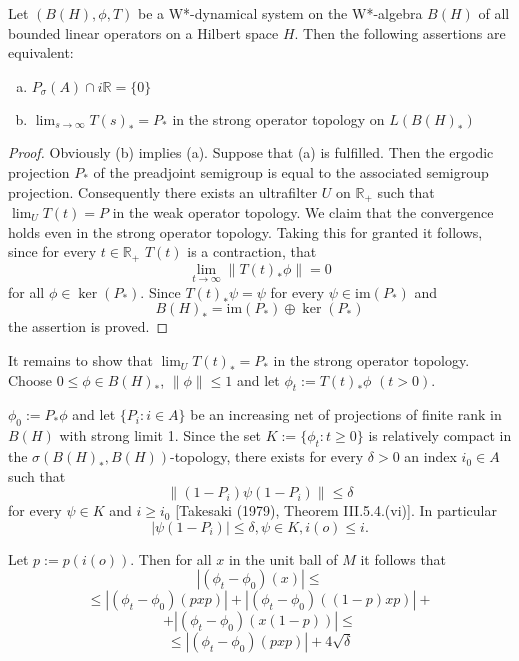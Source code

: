 \begin{proposition}\label{prop:d4-3-7}
Let \((B(H),\phi,T)\) be a W*-dynamical system on the W*-algebra \(B(H)\) of all bounded linear operators on a Hilbert space \(H\).
Then the following assertions are equivalent:
\begin{enumerate}[(a)]
\item
\(P_{\sigma}(A) \cap i\mathbb{R} = \{0\}\)

\item
\(\lim_{s \to \infty} T(s)_{*} = P_{*}\) in the strong operator topology on \(L(B(H)_{*})\)
\end{enumerate}
\end{proposition}

\begin{proof}
Obviously (b) implies (a).
Suppose that (a) is fulfilled.
Then the ergodic projection \(P_{*}\) of the preadjoint semigroup is equal to the associated semigroup projection.
Consequently there exists an ultrafilter \(U\) on \(\mathbb{R}_{+}\) such that \(\lim_{U} T(t) = P\) in the weak operator topology.
We claim that the convergence holds even in the strong operator topology.
Taking this for granted it follows, since for every \(t \in \mathbb{R}_{+}\) \(T(t)\) is a contraction, that
\[
\lim_{t \to \infty} \|T(t)_{*}\phi\| = 0
\]
for all \(\phi \in \ker(P_{*})\).
Since \(T(t)_{*}\psi = \psi\) for every \(\psi \in \text{im}(P_{*})\) and
\[
B(H)_{*} = \text{im}(P_{*}) \oplus \ker(P_{*})
\]
the assertion is proved.
\end{proof}


It remains to show that \(\lim_{U} T(t)_{*} = P_{*}\) in the strong operator topology.
Choose \(0 \leq \phi \in B(H)_{*}\), \(\|\phi\| \leq 1\) and let \(\phi_{t} := T(t)_{*}\phi\) \((t>0)\).

\newpage

\(\phi_{0} := P_{*}\phi\) and let \(\{P_{i}: i \in A\}\) be an increasing net of projections of finite rank in \(B(H)\) with strong limit 1.
Since the set \(K := \{\phi_{t}: t \geq 0\}\) is relatively compact in the \(\sigma(B(H)_{*},B(H))\)-topology, there exists for every \(\delta > 0\) an index \(i_{0} \in A\) such that
\[
\|(1 - P_{i})\psi(1 - P_{i})\| \leq \delta
\]
for every \(\psi \in K\) and \(i \geq i_{0}\) [Takesaki (1979), Theorem III.5.4.(vi)].
In particular
\[
|\psi(1 - P_{i})| \leq \delta, \psi \in K, i(o) \leq i.
\]

Let \(p := p(i(o))\).
Then for all \(x\) in the unit ball of \(M\) it follows that
\[
|(\phi_{t} - \phi_{0})(x)| \leq
\]
\[
\leq |(\phi_{t} - \phi_{0})(pxp)| + |(\phi_{t} - \phi_{0})((1-p)xp)| +
\]
\[
+ |(\phi_{t} - \phi_{0})(x(1-p))| \leq
\]
\[
\leq |(\phi_{t} - \phi_{0})(pxp)| + 4\sqrt{\delta}
\]

